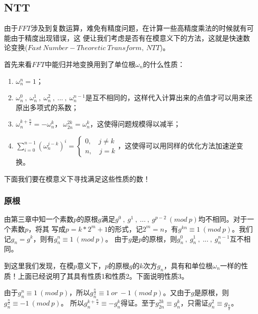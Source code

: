 

\subsection{NTT}
由于$FFT$涉及到复数运算，难免有精度问题，在计算一些高精度乘法的时候就有可能由于精度出现错误，这
便让我们考虑是否有在模意义下的方法，这就是{\heiti 快速数论变换}($Fast\ Number-Theoretic\ Transform,\ NTT$)。

首先来看$FFT$中能归并地变换用到了单位根$\omega_n$的什么性质：
\begin{enumerate}
\item $\omega_n^n = 1$；
\item $\omega_n^0\ ,\ \omega_n^1\ ,\ \omega_n^2\ ,\ ...\ ,\ \omega_n^{n-1}$是互不相同的，这样代入计算出来的点值才可以用来还原出多项式的系数；
\item $\omega_n^{k+\frac{n}{2}}=-\omega_n^{k}$，$\ \omega_{2n}^{2k}=\omega_n^k$，这使得问题规模得以减半；
\item $\sum_{i=0}^{n-1}(\omega_n^{j-k})^i = \left\{\begin{matrix}
0,\quad j\neq k\\ 
n,\quad j= k
\end{matrix}\right.$，这使得可以用同样的优化方法加速逆变换。
\end{enumerate}

下面我们要在模意义下寻找满足这些性质的数！

\subsubsection{原根}
由第三章中知一个素数$p$的原根$g$满足$g^0\ ,\ g^1\ ,\ ...\ ,\ g^{p-2}\ (mod\ p)$均不相同。对于一个素数$p$，将其
写成$p=k*2^m + 1$的形式，记$2^m=n$，有$g^{kn}\equiv 1\ (mod\ p)$。我们记$g_n = g^k$，则有$g_n^n\equiv 1\ (mod\ p)$。
由于$g$是$p$的原根，则$g_n^0\ ,\ g_n^1\ ,\ ...\ ,\ g_n^{n-1}$互不相同。

到这里我们发现，在模$p$意义下，$p$的原根$g$的$k$次方$g_n$，具有和单位根$\omega_n$一样的性质！上面已经说明了其具有性质1和性质2。下面说明性质3。

由于$g_n^n\equiv 1\ (mod\ p)$，所以$g_n^{\frac{n}{2}}\equiv 1\ or\ -1\ (mod\ p)$。又由于$g$是原根，则$g_n^{\frac{n}{2}}\equiv -1\ (mod\ p)$。
所以$g_n^{k+\frac{n}{2}}\equiv -g_n^{k}$得证。至于$g_{2n}^{2k}\equiv g_n^k$，只需证$g_n^2\equiv g_{\frac{n}{2}}$。


